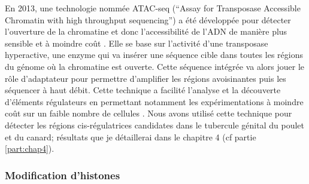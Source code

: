 En 2013, une technologie nommée ATAC-seq (“Assay for Transposase Accessible Chromatin with high throughput sequencing”) a été développée pour détecter l’ouverture de la chromatine et donc l’accessibilité de l’ADN de manière plus sensible et à moindre coût \citep{buenrostro_transposition_2013}. Elle se base sur l’activité d’une transposase hyperactive, une enzyme qui va insérer une séquence cible dans toutes les régions du génome où la chromatine est ouverte. Cette séquence intégrée va alors jouer le rôle d'adaptateur pour permettre d’amplifier les régions avoisinantes puis les séquencer à haut débit. Cette technique a facilité l’analyse et la découverte d’éléments régulateurs en permettant notamment les expérimentations à moindre coût sur un faible nombre de cellules \citep{daugherty_chromatin_2017}. Nous avons utilisé cette technique pour détecter les régions \gls{cis}-régulatrices candidates dans le tubercule génital du poulet et du canard; résultats que je détaillerai dans le chapitre 4 (cf partie \ref{part:chap4}). 

\subsubsection{Modification d’histones}
\label{subsubsec:histone}

